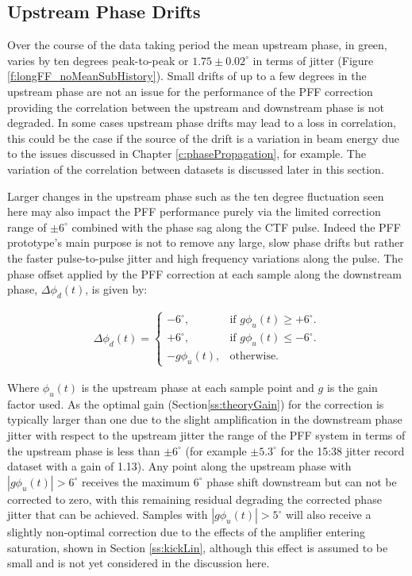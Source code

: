 \subsection{Upstream Phase Drifts}
\label{ss:longFF_upDrifts}

Over the course of the data taking period the mean upstream phase, in green, varies by 
ten degrees peak-to-peak or \(1.75 \pm 0.02^\circ\) in terms of jitter (Figure 
\ref{f:longFF_noMeanSubHistory}). Small drifts of up to a few degrees in the upstream 
phase are not an issue for the performance of the PFF correction providing the 
correlation between the upstream and downstream phase is not degraded. In some cases 
upstream phase drifts may lead to a loss in correlation, this could be the case if the 
source of the drift is a variation in beam energy due to the issues discussed in Chapter \ref{c:phasePropagation}, for example. The variation of the correlation between datasets is discussed later in this section.



Larger changes in the upstream phase such as the ten degree fluctuation seen here may 
also impact the PFF performance purely via the limited correction range of 
\(\pm6^\circ\) combined with the phase sag along the CTF pulse. Indeed the PFF 
prototype's main purpose is not to remove any large, slow phase drifts but rather the 
faster pulse-to-pulse jitter and high frequency variations along the pulse. The phase 
offset applied by the PFF correction at each sample along the downstream phase, 
\(\Delta\phi_d(t)\), is given by:


\begin{eqnarray}
	\Delta\phi_d(t) = \begin{cases}
	-6^\circ, &  \text{if $g\phi_u(t) \geq+6^\circ$.}\\
	+6^\circ, &  \text{if $g\phi_u(t)\leq-6^\circ$}.\\
	-g\phi_u(t), &  \text{otherwise.}
	\end{cases}
	\label{e:limCorrection}
\end{eqnarray}

Where \(\phi_u(t)\) is the upstream phase at each sample point and \(g\) is the gain 
factor used. As the optimal gain (Section\ref{ss:theoryGain}) for the correction is 
typically larger than one due to the slight amplification in the downstream phase jitter with respect to the upstream jitter the range of the PFF system in terms of the upstream phase is less than \(\pm6^\circ\) (for example \(\pm5.3^\circ\) for the 15:38 jitter 
record dataset with a gain of 1.13). Any point along the upstream phase with 
\(|g\phi_u(t)| > 6^\circ\) receives the maximum \(6^\circ\) phase shift downstream but 
can not be corrected to zero, with this remaining residual degrading the corrected phase jitter that can be achieved. Samples with  \(|g\phi_u(t)| > 5^\circ\) will also receive 
a slightly non-optimal correction due to the effects of the amplifier entering 
saturation, shown in Section \ref{ss:kickLin}, although this effect is assumed to be 
small and is not yet considered in the discussion here. 


